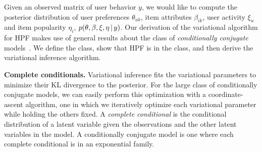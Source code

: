 Given an observed matrix of user behavior $y$, we would like to
compute the posterior distribution of user preferences $\theta_{uk}$,
item attributes $\beta_{ik}$, user activity $\xi_u$ and item
popularity $\eta_i$, $p(\theta, \beta, \xi, \eta \,\vert\, y)$.  Our
derivation of the variational algorithm for HPF makes use of
general results about the class of \textit{conditionally conjugate}
models~\cite{Ghahramani:2001,Hoffman:2013}.  We define the class, show
that HPF is in the class, and then derive the variational
inference algorithm.

{\bf Complete conditionals.}  Variational inference fits the
variational parameters to minimize their KL divergence to the
posterior. For the large class of conditionally conjugate models, we
can easily perform this optimization with a coordinate-ascent
algorithm, one in which we iteratively optimize each variational
parameter while holding the others fixed.  A \textit{complete
conditional} is the conditional distribution of a latent variable
given the observations and the other latent variables in the model.  A
conditionally conjugate model is one where each complete conditional
is in an exponential family.

